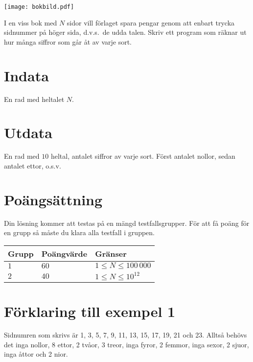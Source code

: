 
\begin{center}
\texttt{[image: bokbild.pdf]}
\end{center}
 
I en viss bok med $N$ sidor vill förlaget spara pengar genom att enbart trycka
sidnummer på höger sida, d.v.s.\ de udda talen. Skriv ett program som
räknar ut hur många siffror som går åt av varje sort.

\section*{Indata}
En rad med heltalet $N$.

\section*{Utdata}
En rad med $10$ heltal, antalet siffror av varje sort. Först antalet nollor, sedan antalet ettor, o.s.v.


\section*{Poängsättning}
Din lösning kommer att testas på en mängd testfallsgrupper.
För att få poäng för en grupp så måste du klara alla testfall i gruppen.

\noindent
\begin{tabular}{| l | l | l |}
\hline
  Grupp & Poängvärde & Gränser \\ \hline
  $1$    & $60$       &  $1 \le N \le 100\,000$   \\ \hline 
  $2$    & $40$       &  $1 \le N \le 10^{12}$ \\ \hline
\end{tabular}


\section*{Förklaring till exempel 1}

Sidnumren som skrivs är 1, 3, 5, 7, 9, 11, 13, 15,
17, 19, 21 och 23. Alltså behövs det inga nollor, 8 ettor, 2 tvåor, 3
treor, inga fyror, 2 femmor, inga sexor, 2 sjuor, inga åttor och 2 nior.


